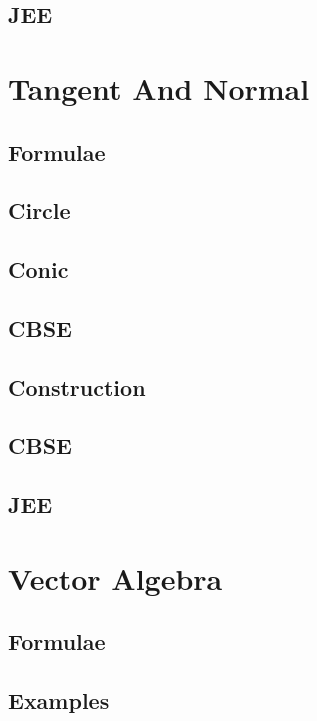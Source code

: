 \documentclass[journal]{IEEEtran}
\begin{document}
\subsection{JEE}
 

\newpage
\section{Tangent And Normal}
\subsection{Formulae}

\subsection{Circle}

\subsection{Conic}

\subsection{CBSE}

\subsection{Construction}

\subsection{CBSE}

\subsection{JEE}
 
%
\newpage
\section{Vector Algebra}
\subsection{Formulae}

\subsection{Examples}

\end{document}
